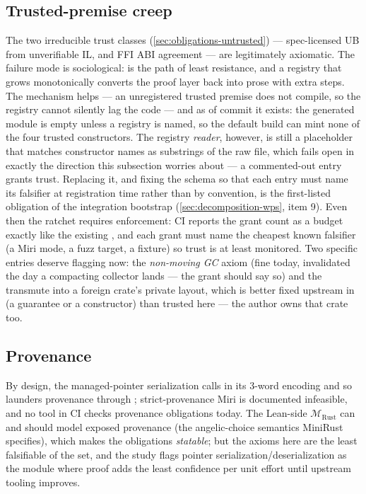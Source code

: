\subsection{Trusted-premise creep}
\label{sec:risks-trust}

The two irreducible trust classes (\cref{sec:obligations-untrusted}) ---
spec-licensed UB from unverifiable IL, and FFI ABI agreement --- are
legitimately axiomatic. The failure mode is sociological:  is the
path of least resistance, and a registry that grows monotonically
converts the proof layer back into prose with extra steps. The
 mechanism helps --- an unregistered trusted premise
does not compile, so the registry cannot silently lag the code --- and
as of  commit  it exists: the generated
 module is empty unless a registry is named, so the
default build can mint none of the four trusted constructors. The
registry \emph{reader}, however, is still a placeholder that matches
constructor names as substrings of the raw file, which fails open in
exactly the direction this subsection worries about --- a
commented-out entry grants trust. Replacing it, and fixing the
 schema so that each entry must name its falsifier
at registration time rather than by convention, is the first-listed
obligation of the integration bootstrap
(\cref{sec:decomposition-wps}, item 9). Even then
the ratchet requires enforcement: CI reports the grant count as a
budget exactly like the existing ,
and each grant must name the cheapest known falsifier (a Miri mode, a
fuzz target, a fixture) so trust is at least monitored. Two specific
entries deserve flagging now: the \emph{non-moving GC} axiom (fine
today, invalidated the day a compacting collector lands --- the grant
should say so) and the  transmute into a foreign
crate's private layout, which is better fixed upstream in
 (a  guarantee or a
constructor) than trusted here --- the author owns that crate too.

\subsection{Provenance}

By design, the managed-pointer serialization calls
 in its 3-word encoding and so launders
provenance through ; strict-provenance Miri is documented
infeasible, and no tool in CI checks provenance obligations today.
The Lean-side $\mathcal{M}_{\mathrm{Rust}}$ can and should model
exposed provenance (the angelic-choice semantics MiniRust specifies),
which makes the obligations \emph{statable}; but the axioms here are
the least falsifiable of the set, and the study flags pointer
serialization/deserialization as the module where proof adds the least
confidence per unit effort until upstream tooling improves.

